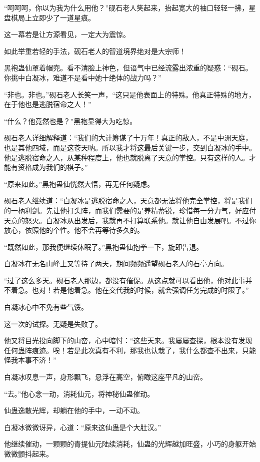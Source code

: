 \begin{this_body}
“呵呵呵，你以为我为什么用他？”砚石老人笑起来，抬起宽大的袖口轻轻一拂，星盘棋局上立即少了一道星痕。

这一幕若是让方源看见，一定大为震惊。

如此举重若轻的手法，砚石老人的智道境界绝对是大宗师！

黑袍蛊仙罩着帽兜。看不清脸上神色，但语气中已经流露出浓重的疑惑：“砚石。你挑中白凝冰，难道不是看中她十绝体的战力吗？”

“非也。非也。”砚石老人长笑一声，“这只是他表面上的特殊。他真正特殊的地方，在于他也是逃脱宿命之人！”

“什么？他竟然也是？”黑袍显得大为吃惊。

砚石老人详细解释道：“我们的大计筹谋了十万年！真正的敌人，不是中洲天庭，也是其他四域，而是这苍天呐。所以我才将这最后关键一步，交到白凝冰的手中。他是逃脱宿命之人，从某种程度上，他也就脱离了天意的掌控。只有这样的人。才能有资格成为我们的棋子。”

“原来如此。”黑袍蛊仙恍然大悟，再无任何疑虑。

砚石老人继续道：“白凝冰是逃脱宿命之人，天意都无法将他完全掌控，将是我们的一柄利剑。先让他打头阵，而我们需要的是养精蓄锐，珍惜每一分力气，好应付天意的怒火。白凝冰从出发后，我就再不打算联系他。就让他自由发展吧。不过你放心，依照他的个性。他不会再等待多久的。

“既然如此，那我便继续休眠了。”黑袍蛊仙抱拳一下，旋即告退。

白凝冰在无名山峰上又等待了两天，期间频频遥望砚石老人的石亭方向。

“过了这么多天。砚石老人那边，都没有催促。从这点就可以看出他，他对此事并不着急。也对！若是他着急。他在交代我的时候，就会强调任务完成的时限了。”

白凝冰心中不免有些气馁。

这一次的试探。无疑是失败了。

他又将目光投向脚下的山峦，心中暗忖：“这些天来。我屡屡查探，根本没有发现任何蛊阵痕迹。唉！若是此次真有不利，那我也认栽了，我什么都查不出来，只能怪我本事不济！”

白凝冰叹息一声，身形飘飞，悬浮在高空，俯瞰这座平凡的山峦。

“去。”他心念一动，消耗仙元，将神秘仙蛊催动。

仙蛊逸散光辉，却躺在他的手中，一动不动。

白凝冰微微讶异，心道：“原来这仙蛊是个大肚汉。”

他继续催动，一颗颗的青提仙元陆续消耗，仙蛊的光辉越加旺盛，小巧的身躯开始微微颤抖起来。


\end{this_body}
